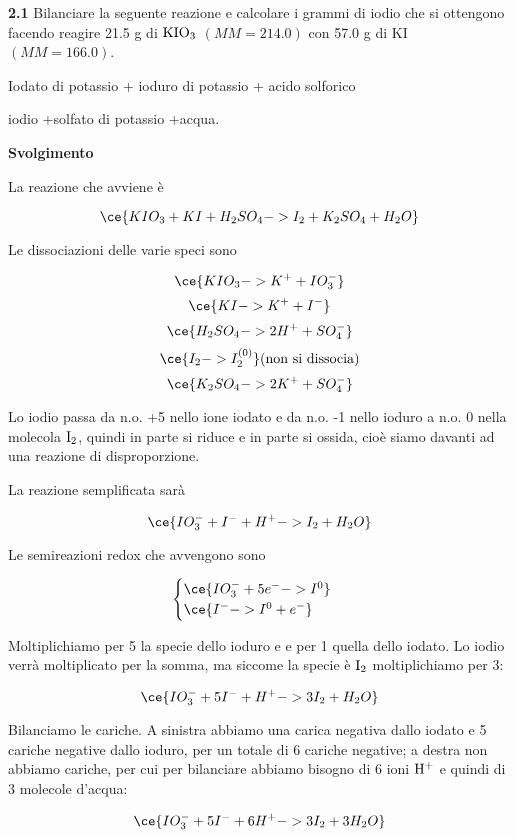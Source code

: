 \vspace{0.2cm}\textbf{2.1} Bilanciare la  seguente reazione e calcolare i grammi di iodio che si ottengono facendo reagire 21.5 g di $\rm KIO_3$ $(MM=214.0)$ con 57.0 g di KI $(MM=166.0)$.

\vspace{0.2cm}
\begin{center}Iodato di potassio + ioduro di potassio + acido solforico \ce{->}

\ce{->}iodio +solfato di potassio +acqua. 
\end{center}

\large\textbf{Svolgimento}\normalsize

\vspace{0.2cm}La reazione che avviene è

$$\ce{KIO_3 + KI + H_2SO_4 -> I_2 + K_2SO_4 + H_2O}$$

Le dissociazioni delle varie speci sono

$$\ce{KIO_3 -> K^+ + IO_3^-}$$
$$\ce{KI -> K^+ + I^-}$$
$$\ce{H_2SO_4 -> 2H^+ + SO_4^-}$$
$$\ce{I_2 -> I_2^{(0)}}\text{(non si dissocia)}$$
$$\ce{K_2SO_4 -> 2K^+ + SO_4^-}$$

Lo iodio passa da n.o. +5 nello ione iodato e da n.o. -1 nello ioduro a n.o. 0 nella molecola $\rm I_2$, quindi in parte si riduce e in parte si ossida, cioè siamo davanti ad una reazione di disproporzione.

La reazione semplificata sarà

$$\ce{IO_3^- + I^- + H^+ -> I_2 + H_2O}$$

Le semireazioni redox che avvengono sono 

$$\begin{cases}
    \ce{IO_3^- + 5e^-  -> I^0}\\
    \ce{I^- -> I^0 + e^-}
\end{cases}$$

Moltiplichiamo per 5 la specie dello ioduro e e per 1 quella dello iodato. Lo iodio verrà moltiplicato per la somma, ma siccome la specie è $\rm I_2$ moltiplichiamo per 3:

$$\ce{IO_3^- + 5I^- + H^+ -> 3I_2 + H_2O}$$

Bilanciamo le cariche. A sinistra abbiamo una carica negativa dallo iodato e 5 cariche negative dallo ioduro, per un totale di 6 cariche negative; a destra non abbiamo cariche, per cui per bilanciare abbiamo bisogno di 6 ioni $\rm H^+$ e quindi di 3 molecole d'acqua:

$$\ce{IO_3^- + 5I^- + 6H^+ -> 3I_2 + 3H_2O}$$

